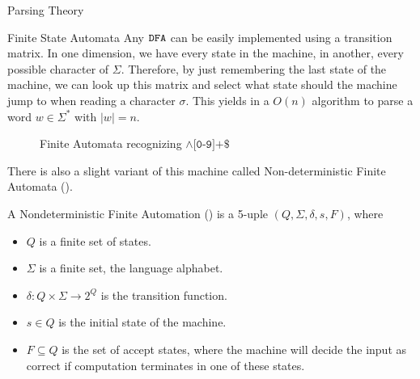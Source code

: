 \begin{section}{Parsing Theory}
\begin{subsection}{Finite State Automata}
Any $\texttt{DFA}$ can be easily implemented using a transition
matrix. In one dimension, we have every state in the machine, in another,
every possible character of $\Sigma$.  Therefore, by just remembering the
last state of the machine, we can look up this matrix and select what state
should the machine jump to when reading a character $\sigma$. This
yields in a $O(n)$ algorithm to parse a word $w \in \Sigma^*$ with $|w| = n$.


\begin{figure}

\caption{Finite Automata recognizing $\land\texttt{[0-9]+\$}$}
\label{fig:a_automata}
\end{figure}

There is also a slight variant of this machine called Non-deterministic Finite Automata ().

\begin{definition}
A Nondeterministic Finite Automation () is a 5-uple
$(Q, \Sigma, \delta, s, F)$, where
\begin{itemize}

\item $Q$ is a finite set of states.
\item $\Sigma$ is a finite set, the language alphabet.
\item $\delta:Q\times\Sigma \longrightarrow 2^Q$ is the transition function.
\item $s \in Q$ is the initial state of the machine.
\item $F \subseteq Q$ is the set of accept states, where the machine will
decide the input as correct if computation terminates in one of these
states.
\end{itemize}
\end{definition}


\end{subsection}
\end{section}
